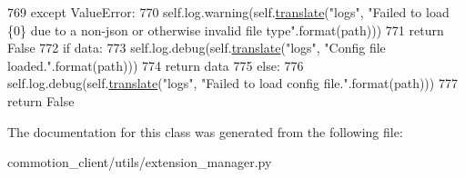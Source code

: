 \begin{DoxyCode}
769             \textcolor{keywordflow}{except} ValueError:
770                 self.log.warning(self.\hyperlink{classcommotion__client_1_1utils_1_1extension__manager_1_1ConfigManager_aa0ce09aefdd36656f0a1abfad14e9ff1}{translate}(\textcolor{stringliteral}{"logs"}, \textcolor{stringliteral}{"Failed to load \{0\} due to a non-json or
       otherwise invalid file type"}.format(path)))
771                 \textcolor{keywordflow}{return} \textcolor{keyword}{False}
772         \textcolor{keywordflow}{if} data:
773             self.log.debug(self.\hyperlink{classcommotion__client_1_1utils_1_1extension__manager_1_1ConfigManager_aa0ce09aefdd36656f0a1abfad14e9ff1}{translate}(\textcolor{stringliteral}{"logs"}, \textcolor{stringliteral}{"Config file loaded."}.format(path)))
774             \textcolor{keywordflow}{return} data
775         \textcolor{keywordflow}{else}:
776             self.log.debug(self.\hyperlink{classcommotion__client_1_1utils_1_1extension__manager_1_1ConfigManager_aa0ce09aefdd36656f0a1abfad14e9ff1}{translate}(\textcolor{stringliteral}{"logs"}, \textcolor{stringliteral}{"Failed to load config file."}.format(path)))
777             \textcolor{keywordflow}{return} \textcolor{keyword}{False}
\end{DoxyCode}


The documentation for this class was generated from the following file\-:\begin{DoxyCompactItemize}
\item 
commotion\-\_\-client/utils/extension\-\_\-manager.\-py\end{DoxyCompactItemize}
